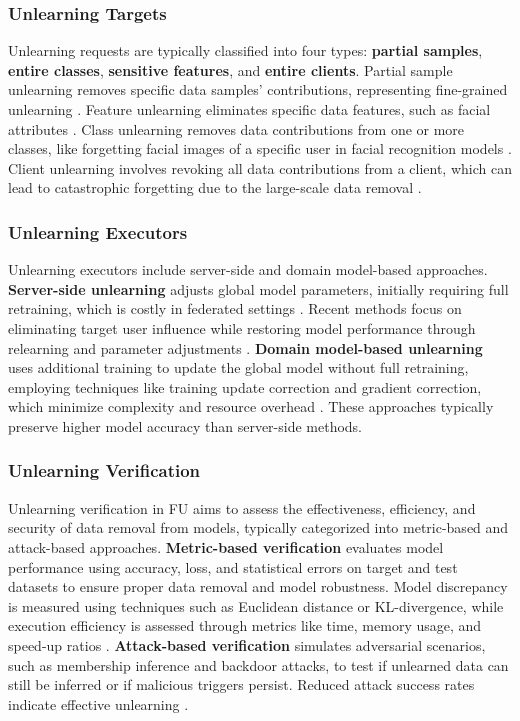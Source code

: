 \subsubsection{Unlearning Targets}
Unlearning requests are typically classified into four types:\textbf{ partial samples}, \textbf{entire classes}, \textbf{sensitive features}, and \textbf{entire clients}. Partial sample unlearning removes specific data samples' contributions, representing fine-grained unlearning \cite{ma2022learn, shah2023unlearning}. Feature unlearning eliminates specific data features, such as facial attributes \cite{gu2024ferrari}. Class unlearning removes data contributions from one or more classes, like forgetting facial images of a specific user in facial recognition models \cite{wang2022federated, gu2024few}. Client unlearning involves revoking all data contributions from a client, which can lead to catastrophic forgetting due to the large-scale data removal \cite{Gu2024Unlearning, nguyen2022markov}.


\subsubsection{Unlearning Executors}

Unlearning executors include server-side and domain model-based approaches.\textbf{ Server-side unlearning} adjusts global model parameters, initially requiring full retraining, which is costly in federated settings \cite{liu2022right}. Recent methods focus on eliminating target user influence while restoring model performance through relearning and parameter adjustments \cite{su2023asynchronous, fraboni2024sifu}. \textbf{Domain model-based unlearning} uses additional training to update the global model without full retraining, employing techniques like training update correction and gradient correction, which minimize complexity and resource overhead \cite{hacohen2019power, wu2022federated, gao2024verifi, halimi2022federated}. These approaches typically preserve higher model accuracy than server-side methods.

\subsubsection{Unlearning Verification}
Unlearning verification in FU aims to assess the effectiveness, efficiency, and security of data removal from models, typically categorized into metric-based and attack-based approaches. \textbf{Metric-based verification} evaluates model performance using accuracy, loss, and statistical errors on target and test datasets to ensure proper data removal and model robustness. Model discrepancy is measured using techniques such as Euclidean distance or KL-divergence, while execution efficiency is assessed through metrics like time, memory usage, and speed-up ratios \cite{cao2023fedrecover}. \textbf{Attack-based verification} simulates adversarial scenarios, such as membership inference and backdoor attacks, to test if unlearned data can still be inferred or if malicious triggers persist. Reduced attack success rates indicate effective unlearning \cite{zhang2023fedrecovery}.



